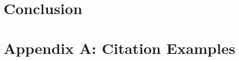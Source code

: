 \documentclass[conference]{IEEEtran}
\begin{document}
\section{Conclusion}


\section*{Appendix A:  Citation Examples}





\newcommand{\noroffcount}[1]{%
\immediate\write18{texcount -v0 -q -total  -sum -merge -q #1.tex > #1-words.noroff }%
}
%
%

\newcommand{\NUCwordcount}[1]{
    \section*{Word count metrics}
    \framebox{%
    \begin{minipage}{0.95\textwidth}
    \textbf{NUC Studio2 Word Count}:\\
    \noroffcount{#1}
    NOTE: References are excluded.
    \end{minipage}}
}

\newpage
\end{document}
